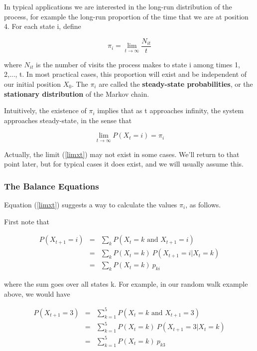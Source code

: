 In typical applications we are interested in the long-run distribution of the
process, for example the long-run proportion of the time that we are at position
4. For each state i, define

\begin{equation}
\label{limnt}
\pi_{i}=\lim_{t\rightarrow \infty }\frac{N_{it}}{t}
\end{equation}

where $N_{it}$ is the number of visits the process makes to state i
among times 1, 2,..., t. In most practical cases, this proportion will
exist and be independent of our initial position $X_{0}$.  The $\pi_i$
are called the {\bf steady-state probabilities}, or the {\bf stationary
distribution} of the Markov chain.

Intuitively, the existence of $\pi_{i}$ implies that as t approaches
infinity, the system approaches steady-state, in the sense that

\begin{equation}
\label{limxt}
\lim_{t\rightarrow \infty }P(X_{t}=i)=\pi_{i}
\end{equation}

Actually, the limit (\ref{limxt}) may not exist in some cases.  We'll
return to that point later, but for typical cases it does exist, and we
will usually assume this.  

\subsubsection{The Balance Equations}
\label{baleqns}

Equation (\ref{limxt}) suggests a way to calculate the values $\pi_{i}$,
as follows.

First note that

\begin{eqnarray}
P(X_{t+1}=i)
&=& \sum_{k} P(X_{t}=k \textrm{ and } X_{t+1}=i) \\
&=& \sum_{k} P(X_{t}=k) ~ P(X_{t+1}=i | X_t = k) \\
&=& \sum_{k} P(X_{t}=k) ~ p_{ki}
\label{prestation}
\end{eqnarray}

where the sum goes over all states k.  For example, in our random walk
example above, we would have

\begin{eqnarray}
P(X_{t+1}=3)
&=& \sum_{k=1}^5 P(X_{t}=k \textrm{ and } X_{t+1}=3) \\
&=& \sum_{k=1}^5 P(X_{t}=k) ~ P(X_{t+1}=3 | X_t = k) \\
&=& \sum_{k=1}^5 P(X_{t}=k)~ p_{k3}
\end{eqnarray}

